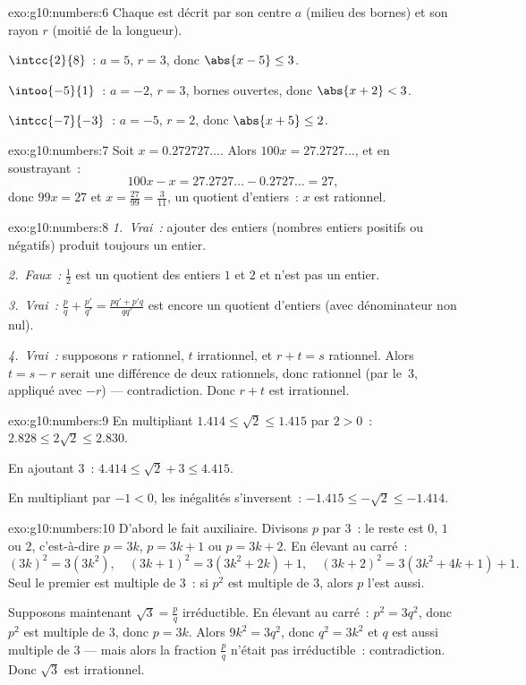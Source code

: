 \begin{solution}{exo:g10:numbers:6}
Chaque  est décrit par son centre $a$ (milieu des bornes) et
son rayon $r$ (moitié de la longueur).

$\intcc{2}{8}$~: $a = 5$, $r = 3$, donc $\abs{x - 5} \leq 3$.

$\intoo{-5}{1}$~: $a = -2$, $r = 3$, bornes ouvertes, donc
$\abs{x + 2} < 3$.

$\intcc{-7}{-3}$~: $a = -5$, $r = 2$, donc $\abs{x + 5} \leq 2$.
\end{solution}

\begin{solution}{exo:g10:numbers:7}
Soit $x = 0.272727\dots$. Alors $100x = 27.2727\dots$, et en
soustrayant~:
\[
100x - x = 27.2727\dots - 0.2727\dots = 27,
\]
donc $99x = 27$ et $x = \frac{27}{99} = \frac{3}{11}$, un quotient
d'entiers~: $x$ est rationnel.
\end{solution}

\begin{solution}{exo:g10:numbers:8}
\emph{1.~Vrai~:} ajouter des entiers (nombres entiers positifs ou
négatifs) produit toujours un entier.

\emph{2.~Faux~:} $\frac{1}{2}$ est un quotient des entiers $1$ et $2$
et n'est pas un entier.

\emph{3.~Vrai~:} $\frac pq + \frac{p'}{q'} = \frac{pq' + p'q}{qq'}$
est encore un quotient d'entiers (avec dénominateur non nul).

\emph{4.~Vrai~:} supposons $r$ rationnel, $t$ irrationnel, et
$r + t = s$ rationnel. Alors $t = s - r$ serait une différence de
deux rationnels, donc rationnel (par le~3, appliqué avec $-r$) ---
contradiction. Donc $r + t$ est irrationnel.
\end{solution}

\begin{solution}{exo:g10:numbers:9}
En multipliant $1.414 \leq \sqrt2 \leq 1.415$ par $2 > 0$~:
$2.828 \leq 2\sqrt2 \leq 2.830$.

En ajoutant $3$~: $4.414 \leq \sqrt2 + 3 \leq 4.415$.

En multipliant par $-1 < 0$, les inégalités s'inversent~:
$-1.415 \leq -\sqrt2 \leq -1.414$.
\end{solution}

\begin{solution}{exo:g10:numbers:10}
D'abord le fait auxiliaire. Divisons $p$ par $3$~: le reste est $0$,
$1$ ou $2$, c'est-à-dire $p = 3k$, $p = 3k+1$ ou $p = 3k+2$. En
élevant au carré~:
\[
(3k)^2 = 3(3k^2), \quad
(3k+1)^2 = 3(3k^2 + 2k) + 1, \quad
(3k+2)^2 = 3(3k^2 + 4k + 1) + 1 .
\]
Seul le premier est multiple de $3$~: si $p^2$ est multiple de $3$,
alors $p$ l'est aussi.

Supposons maintenant $\sqrt3 = \frac pq$ irréductible. En élevant au
carré~: $p^2 = 3q^2$, donc $p^2$ est multiple de $3$, donc $p = 3k$.
Alors $9k^2 = 3q^2$, donc $q^2 = 3k^2$ et $q$ est aussi multiple de
$3$ --- mais alors la fraction $\frac pq$ n'était pas irréductible~:
contradiction. Donc $\sqrt3$ est irrationnel.
\end{solution}

